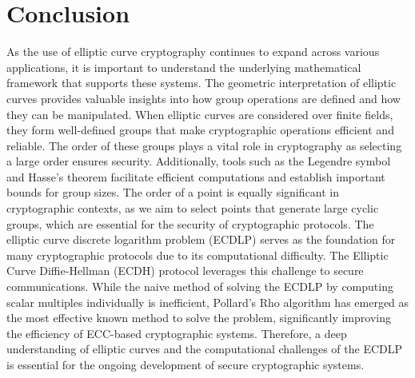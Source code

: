 \documentclass[11pt]{article}
\begin{document}
\section{Conclusion}
As the use of elliptic curve cryptography continues to expand across various applications, it is important to understand the underlying mathematical framework that supports these systems. The geometric interpretation of elliptic curves provides valuable insights into how group operations are defined and how they can be manipulated. When elliptic curves are considered over finite fields, they form well-defined groups that make cryptographic operations efficient and reliable. The order of these groups plays a vital role in cryptography as selecting a large order ensures security. Additionally, tools such as the Legendre symbol and Hasse's theorem facilitate efficient computations and establish important bounds for group sizes. The order of a point is equally significant in cryptographic contexts, as we aim to select points that generate large cyclic groups, which are essential for the security of cryptographic protocols. The elliptic curve discrete logarithm problem (ECDLP) serves as the foundation for many cryptographic protocols due to its computational difficulty. The Elliptic Curve Diffie-Hellman (ECDH) protocol leverages this challenge to secure communications. While the naive method of solving the ECDLP by computing scalar multiples individually is inefficient, Pollard’s Rho algorithm has emerged as the most effective known method to solve the problem, significantly improving the efficiency of ECC-based cryptographic systems. Therefore, a deep understanding of elliptic curves and the computational challenges of the ECDLP is essential for the ongoing development of secure cryptographic systems.

\newpage

\begin{appendices}
\label{app:python_code}

\end{appendices}

\newpage

\end{document}
